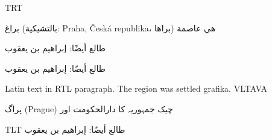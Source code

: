 \documentclass{article}
\begin{document}
\pokus


\pardir TRT


براغ (بالتشيكية: Praha, Česká republika، براها) هي عاصمة 

طالع أيضًا: إبراهيم بن يعقوب



\arab

طالع أيضًا: إبراهيم بن يعقوب

\libertine

Latin text in RTL paragraph. The region was settled grafika. VLTAVA %

\noto 

پراگ (Prague) چیک جمہوریہ کا دارالحکومت اور


\pardir TLT
\arab
طالع أيضًا: إبراهيم بن يعقوب



\end{document}
